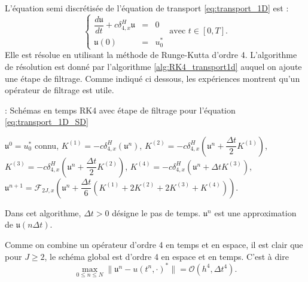 L'équation semi discrétisée de l'équation de transport \eqref{eq:transport_1D} est :
\begin{equation}
\left\lbrace
\begin{array}{rcl}
\dfrac{d \mathfrak{u}}{dt} + c \delta_{4,x}^H \mathfrak{u}& = &0 \\
\mathfrak{u}(0) & = & u_0^*
\end{array}
\text{ avec } t \in [0,T].
\right.
\label{eq:transport_1D_SD}
\end{equation}
Elle est résolue en utilisant la méthode de Runge-Kutta d'ordre 4. L'algorithme de résolution est donné par l'algorithme \ref{alg:RK4_transport1d} auquel on ajoute une étape de filtrage. Comme indiqué ci dessous, les expériences montrent qu'un opérateur de filtrage \cite{Visbal2002} est utile.
\begin{center}
\begin{minipage}[H]{12cm}
  \begin{algorithm}[H]
    \caption{: Schémas en temps RK4 avec étape de filtrage pour l'équation \eqref{eq:transport_1D_SD}}\label{alg:RK4_transport1d}
    \begin{algorithmic}[1]
    \State $\mathfrak{u}^0 = u_0^*$ connu,
             \State  $K^{(1)} = - c \delta_{4,x}^H \left( \mathfrak{u}^n \right)$,
             \State  $K^{(2)} = - c \delta_{4,x}^H \left( \mathfrak{u}^n + \dfrac{\Delta t}{2} K^{(1)}\right)$,
             \State  $K^{(3)} = - c \delta_{4,x}^H \left( \mathfrak{u}^n + \dfrac{\Delta t}{2} K^{(2)}\right)$,
             \State  $K^{(4)} = - c \delta_{4,x}^H \left( \mathfrak{u}^n + \Delta t K^{(3)}\right)$,  
             \State  $\mathfrak{u}^{n+1} = \mathcal{F}_{2J,x}\left( \mathfrak{u}^n  + \dfrac{\Delta t}{6} \left( K^{(1)} + 2 K^{(2)} + 2 K^{(3)} + K^{(4)} \right) \right)$.
            \EndFor
    \end{algorithmic}
    \end{algorithm}
\end{minipage}
\end{center}
Dans cet algorithme, $\Delta t > 0$ désigne le pas de temps. $\mathfrak{u}^n$ est une approximation de $\mathfrak{u}(n \Delta t)$.

Comme on combine un opérateur d'ordre 4 en temps et en espace, il est clair que pour $J \geq 2$, le schéma global est d'ordre 4 en espace et en temps. C'est à dire
\begin{equation}
\max_{0 \leq n \leq N} \| \mathfrak{u}^n - u(t^n,\cdot)^* \| = \mathcal{O} \left( h^4 , \Delta t^4 \right).
\end{equation}




